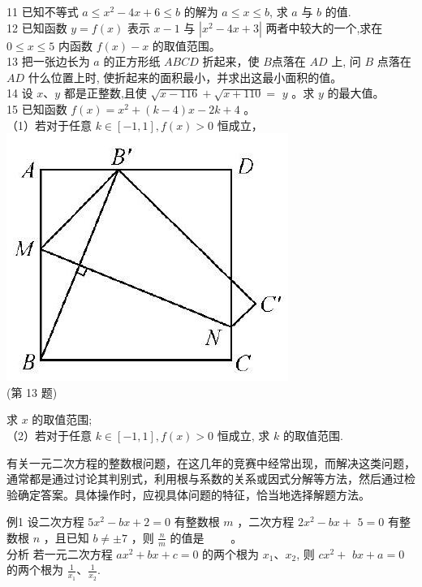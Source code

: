 \documentclass[10pt]{article}
\begin{document}
11 已知不等式 $a \leqslant x^{2}-4 x+6 \leqslant b$ 的解为 $a \leqslant x \leqslant b$, 求 $a$ 与 $b$ 的值.\\
12 已知函数 $y=f(x)$ 表示 $x-1$ 与 $\left|x^{2}-4 x+3\right|$ 两者中较大的一个,求在 $0 \leqslant x \leqslant 5$ 内函数 $f(x)-x$ 的取值范围。\\
13 把一张边长为 $a$ 的正方形纸 $A B C D$ 折起来，使 $B$点落在 $A D$ 上, 问 $B$ 点落在 $A D$ 什么位置上时, 使折起来的面积最小，并求出这最小面积的值。\\
14 设 $x 、 y$ 都是正整数,且使 $\sqrt{x-116}+\sqrt{x+110}=$ $y$ 。求 $y$ 的最大值。\\
15 已知函数 $f(x)=x^{2}+(k-4) x-2 k+4$ 。\\
（1）若对于任意 $k \in[-1,1], f(x)>0$ 恒成立，\\
\includegraphics[max width=\textwidth, center]{2024_10_30_1bf34f7aeb61f11d11d3g-080}\\
(第 13 题)

求 $x$ 的取值范围;\\
（2）若对于任意 $k \in[-1,1], f(x)>0$ 恒成立, 求 $k$ 的取值范围.

有关一元二次方程的整数根问题，在这几年的竞赛中经常出现，而解决这类问题，通常都是通过讨论其判别式，利用根与系数的关系或因式分解等方法，然后通过检验确定答案。具体操作时，应视具体问题的特征，恰当地选择解题方法。

例1 设二次方程 $5 x^{2}-b x+2=0$ 有整数根 $m$ ，二次方程 $2 x^{2}-b x+$ $5=0$ 有整数根 $n$ ，且已知 $b \neq \pm 7$ ，则 $\frac{n}{m}$ 的值是 $\qquad$。\\
分析 若一元二次方程 $a x^{2}+b x+c=0$ 的两个根为 $x_{1} 、 x_{2}$, 则 $c x^{2}+$ $b x+a=0$ 的两个根为 $\frac{1}{x_{1}} 、 \frac{1}{x_{2}}$.
\end{document}
